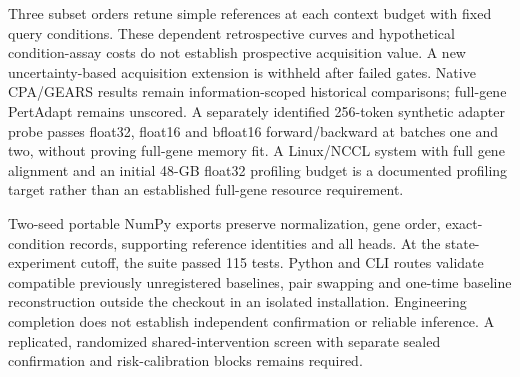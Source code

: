 Three subset orders retune simple references at each context budget with fixed query conditions. These dependent retrospective curves and hypothetical condition-assay costs do not establish prospective acquisition value. A new uncertainty-based acquisition extension is withheld after failed gates. Native CPA/GEARS results remain information-scoped historical comparisons; full-gene PertAdapt remains unscored. A separately identified 256-token synthetic adapter probe passes float32, float16 and bfloat16 forward/backward at batches one and two, without proving full-gene memory fit. A Linux/NCCL system with full gene alignment and an initial 48-GB float32 profiling budget is a documented profiling target rather than an established full-gene resource requirement.

Two-seed portable NumPy exports preserve normalization, gene order, exact-condition records, supporting reference identities and all heads. At the state-experiment cutoff, the suite passed 115 tests. Python and CLI routes validate compatible previously unregistered baselines, pair swapping and one-time baseline reconstruction outside the checkout in an isolated installation. Engineering completion does not establish independent confirmation or reliable inference. A replicated, randomized shared-intervention screen with separate sealed confirmation and risk-calibration blocks remains required.
